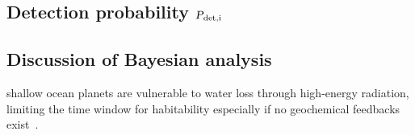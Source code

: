%
%
%


\subsection{Detection probability $\textsl{P}_\mathrm{det, i}$}



\subsection{Discussion of Bayesian analysis}

\begin{note}
    shallow ocean planets are vulnerable to water loss through high-energy radiation, limiting the time window for habitability especially if no geochemical feedbacks exist~\citep{Kite2018}.
\end{note}






